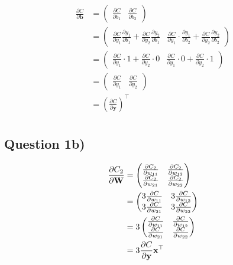\documentclass{article}
\begin{document}
\begin{align*}
\frac{\partial C}{\partial \textbf{b}}&=\begin{pmatrix}{\frac{\partial C}{\partial b_{1}}} & {\frac{\partial C}{\partial b_{2}}}\end{pmatrix}\\
&=\begin{pmatrix} {\frac{\partial C}{\partial y_{1}} \frac{\partial y_{1}}{\partial b_{1}}+\frac{\partial C}{\partial y_{2}} \frac{\partial y_{2}}{\partial b_{1}}} & {\frac{\partial C}{\partial y_{1}} \cdot \frac{\partial y_{1}}{\partial b_{2}}+\frac{\partial C}{\partial y_{2}} \frac{\partial y_{2}}{\partial b_{2}}} \end{pmatrix} \\
&=\begin{pmatrix} {\frac{\partial C}{\partial y_{1}} \cdot 1+\frac{\partial C}{\partial y_{2}} \cdot 0} & {\frac{\partial C}{\partial y_{1}} \cdot 0+\frac{\partial C}{\partial y_{2}} \cdot 1} \end{pmatrix} \\
&=\begin{pmatrix}{\frac{\partial C}{\partial y_{1}}} & {\frac{\partial C}{\partial y_{2}}}\end{pmatrix}\\
&=\left(\frac{\partial C}{\partial \textbf{y}}\right)^{\top}\\
\end{align*}


\subsection{Question 1b)}

\begin{align*}
\frac{\partial C_{2}}{\partial \textbf{W}}&=\begin{pmatrix}{\frac{\partial C_{2}}{\partial w_{11}}} & {\frac{\partial C_{2}}{\partial w_{12}}} \\ {\frac{\partial C_{2}}{\partial w_{21}}} & {\frac{\partial C_{2}}{\partial w_{22}}}\end{pmatrix}\\
&=\begin{pmatrix}{3 \frac{\partial C}{\partial w_{11}}} & {3 \frac{\partial C}{\partial w_{12}}} \\ {3 \frac{\partial C}{\partial w_{21}}} & {3 \frac{\partial C}{\partial w_{22}}}\end{pmatrix}\\
&=3\begin{pmatrix}{\frac{\partial C}{\partial w_{11}}} & {\frac{\partial C}{\partial w_{12}}} \\ {\frac{\partial C}{\partial w_{21}}} & {\frac{\partial C}{\partial w_{22}}}\end{pmatrix}\\
&=3\frac{\partial C}{\partial \textbf{\textbf{y}}} \textbf{x}^{\top}\\
\end{align*}
\end{document}
